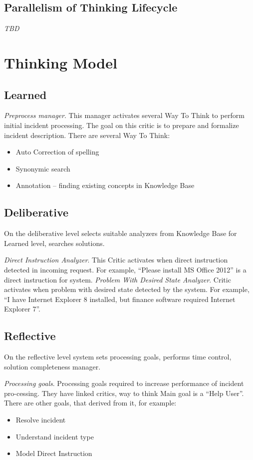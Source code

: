 \documentclass[12pt]{article}
\begin{document}
\subsection{Parallelism of Thinking Lifecycle}

\emph{TBD}

\section{Thinking Model}

\subsection{Learned}

\emph{Preprocess manager}. This manager activates several Way To Think to perform initial incident processing. The goal on this critic is to prepare and formalize incident description. There are several Way To Think:
\begin{itemize}
 \item Auto Correction of spelling
 \item Synonymic search
 \item Annotation – finding existing concepts in Knowledge Base
\end{itemize}

\subsection{Deliberative}

On the deliberative level selects suitable analyzers from Knowledge Base for Learned level, searches solutions.

\emph{Direct Instruction Analyzer}. This Critic activates when direct instruction detected in incoming request. For example, “Please install MS Office 2012” is a direct instruction for system.
\emph{Problem With Desired State Analyzer}. Critic activates when problem with desired state detected by the system. For example, “I have Internet Explorer 8 installed, but finance software required Internet Explorer 7”.

\subsection{Reflective}

On the reflective level system sets processing goals, performs time control, solution completeness manager.

\emph{Processing goals}. Processing goals required to increase performance of incident pro-cessing. They have linked critics, way to think Main goal is a “Help User”. There are other goals, that derived from it, for example:
\begin{itemize}
 \item Resolve incident
 \item Understand incident type
 \item Model Direct Instruction
\end{itemize}
\end{document}

